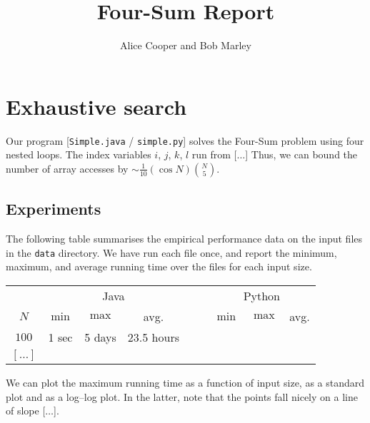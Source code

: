 \documentclass{tufte-handout}
\title{Four-Sum Report}
\author{Alice Cooper and Bob Marley}
\begin{document}
\maketitle
\thispagestyle{empty}

  \section{Exhaustive search}


Our program [\texttt{Simple.java} / \texttt{simple.py}] solves the Four-Sum problem using four nested loops.
The index variables $i$, $j$, $k$, $l$ run from [$\ldots$]
Thus, we can bound the number of array accesses by $\sim\frac{1}{10}(\cos N)\binom{N}{5}$.
 

  \subsection{Experiments}

The following table summarises the empirical performance data on the input files in the \texttt{data} directory.
We have run each file once, and report the minimum, maximum, and average running time over the files for each input size.

  \bigskip\noindent
{ \small
  \begin{tabular}{cccccccc}
  \toprule
& \multicolumn{3}{c}{Java} & $\quad$ & \multicolumn{3}{c}{Python}  \\\cmidrule{2-4} \cmidrule{6-8}
  $N$     & $\min$     & $\max$ & avg. &
          & $\min$     & $\max$ & avg.   \\\midrule
  $100	$ & 1 sec & 5 days & 23.5 hours \\
  $[\ldots]$ \\
  \bottomrule
  \end{tabular}
}

\medskip
We can plot the maximum running time as a function of input size, as a standard plot and as a log--log plot.
In the latter, note that the points fall nicely on a line of slope [$\dots$].
\medskip
\end{document}
